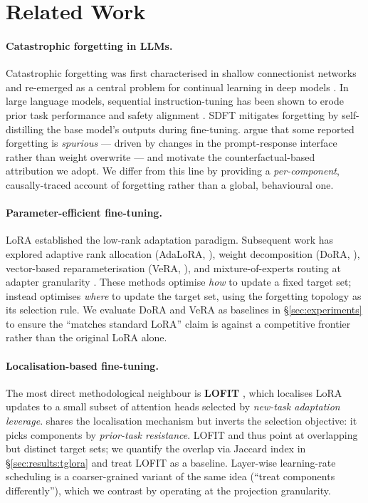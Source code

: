 \section{Related Work}
\label{sec:related}

\paragraph{Catastrophic forgetting in LLMs.}
Catastrophic forgetting was first characterised in shallow connectionist networks \citep{mccloskey1989catastrophic, french1999catastrophic} and re-emerged as a central problem for continual learning in deep models \citep{kirkpatrick2017ewc, aljundi2018memory, lopez2017gem}. In large language models, sequential instruction-tuning has been shown to erode prior task performance and safety alignment \citep[e.g.,][]{luo2023empirical, shi2024sdft, wang2025llmcl}. SDFT \citep{shi2024sdft} mitigates forgetting by self-distilling the base model's outputs during fine-tuning. \citet{spurious2025} argue that some reported forgetting is \textit{spurious} --- driven by changes in the prompt-response interface rather than weight overwrite --- and motivate the counterfactual-based attribution we adopt. We differ from this line by providing a \textit{per-component}, causally-traced account of forgetting rather than a global, behavioural one.

\paragraph{Parameter-efficient fine-tuning.}
LoRA \citep{hu2022lora} established the low-rank adaptation paradigm. Subsequent work has explored adaptive rank allocation (AdaLoRA, \citealp{zhang2023adalora}), weight decomposition (DoRA, \citealp{liu2024dora}), vector-based reparameterisation (VeRA, \citealp{kopiczko2024vera}), and mixture-of-experts routing at adapter granularity \citep{mole2025}. These methods optimise \textit{how} to update a fixed target set; \tglora{} instead optimises \textit{where} to update the target set, using the forgetting topology as its selection rule. We evaluate DoRA and VeRA as baselines in \S\ref{sec:experiments} to ensure the ``matches standard LoRA'' claim is against a competitive frontier rather than the original LoRA alone.

\paragraph{Localisation-based fine-tuning.} The most direct methodological neighbour is \textbf{LOFIT} \citep{yin2024lofit}, which localises LoRA updates to a small subset of attention heads selected by \textit{new-task adaptation leverage}. \tglora{} shares the localisation mechanism but inverts the selection objective: it picks components by \textit{prior-task resistance}. LOFIT and \tglora{} thus point at overlapping but distinct target sets; we quantify the overlap via Jaccard index in \S\ref{sec:results:tglora} and treat LOFIT as a baseline. Layer-wise learning-rate scheduling \citep{lrdistribution2024} is a coarser-grained variant of the same idea (``treat components differently''), which we contrast by operating at the projection granularity.

